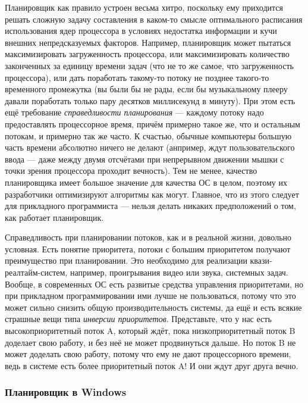 \documentclass[a5paper]{article}
\begin{document}
Планировщик как правило устроен весьма хитро, поскольку ему приходится решать сложную задачу составления в каком-то смысле оптимального расписания использования ядер процессора в условиях недостатка информации и кучи внешних непредсказуемых факторов. Например, планировщик может пытаться максимизировать загруженность процессора, или максимизировать количество законченных за единицу времени задач (что не то же самое, что загруженность процессора), или дать поработать такому-то потоку не позднее такого-то временного промежутка (вы были бы не рады, если бы музыкальному плееру давали поработать только пару десятков миллисекунд в минуту). При этом есть ещё требование \textit{справедливости планирования} --- каждому потоку надо предоставлять процессорное время, причём примерно такое же, что и остальным потокам, и примерно так же часто. К счастью, обычные компьютеры большую часть времени абсолютно ничего не делают (анпример, ждут пользовательского ввода --- даже между двумя отсчётами при непрерывном движении мышки с точки зрения процессора проходит вечность). Тем не менее, качество планировщика имеет большое значение для качества ОС в целом, поэтому их разработчики оптимизируют алгоритмы как могут. Главное, что из этого следует для прикладного программиста --- нельзя делать никаких предположений о том, как работает планировщик.

Справедливость при планировании потоков, как и в реальной жизни, довольно условная. Есть понятие приоритета, потоки с большим приоритетом получают преимущество при планировании. Это необходимо для реализации квази-реалтайм-систем, например, проигрывания видео или звука, системных задач. Вообще, в современных ОС есть развитые средства управления приоритетами, но при прикладном программировании ими лучше не пользоваться, потому что это может сильно снизить общую производительность системы, да ещё и есть всякие страшные вещи типа \textit{инверсии приоритетов}. Представьте, что у нас есть высокоприоритетный поток A, который ждёт, пока низкоприоритетный поток B доделает свою работу, и без неё не может продвинуться дальше. Но поток B не может доделать свою работу, потому что ему не дают процессорного времени, ведь в системе есть более приоритетный поток A! И они ждут друг друга вечно.

\subsubsection{Планировщик в Windows}
\end{document}
